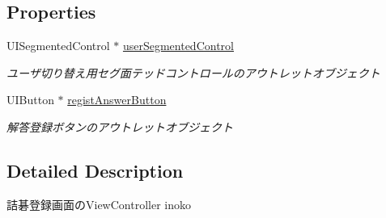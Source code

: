 \subsection*{Properties}
\begin{DoxyCompactItemize}
\item 
\hypertarget{interface_tsumego_regist_view_controller_a86b814388cf64187acdf79b660355eac}{
UISegmentedControl $\ast$ \hyperlink{interface_tsumego_regist_view_controller_a86b814388cf64187acdf79b660355eac}{userSegmentedControl}}
\label{interface_tsumego_regist_view_controller_a86b814388cf64187acdf79b660355eac}

\begin{DoxyCompactList}\small\item\em ユーザ切り替え用セグ面テッドコントロールのアウトレットオブジェクト \end{DoxyCompactList}\item 
\hypertarget{interface_tsumego_regist_view_controller_a32049bfdb1d736429a731e86de7b844c}{
UIButton $\ast$ \hyperlink{interface_tsumego_regist_view_controller_a32049bfdb1d736429a731e86de7b844c}{registAnswerButton}}
\label{interface_tsumego_regist_view_controller_a32049bfdb1d736429a731e86de7b844c}

\begin{DoxyCompactList}\small\item\em 解答登録ボタンのアウトレットオブジェクト \end{DoxyCompactList}\end{DoxyCompactItemize}


\subsection{Detailed Description}
詰碁登録画面のViewController  inoko 

